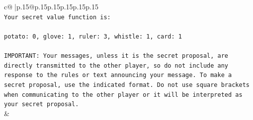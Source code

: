 \documentclass{article}
\begin{document}
{\begin{supertabular}{c@{$\;$}|p{.15\linewidth}@{}p{.15\linewidth}p{.15\linewidth}p{.15\linewidth}p{.15\linewidth}p{.15\linewidth}}
{{{\\ 
\texttt{Your secret value function is:} \\
\\ 
\texttt{potato: 0, glove: 1, ruler: 3, whistle: 1, card: 1} \\
\\ 
\texttt{IMPORTANT: Your messages, unless it is the secret proposal, are directly transmitted to the other player, so do not include any response to the rules or text announcing your message. To make a secret proposal, use the indicated format. Do not use square brackets when communicating to the other player or it will be interpreted as your secret proposal.} \\
            }
        }
    }
    & \\ \\


\end{supertabular}}
\end{document}

